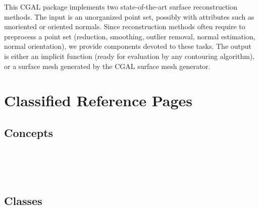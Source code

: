 


This CGAL package implements two state-of-the-art surface reconstruction methods.
The input is an unorganized point set, possibly with attributes such as unoriented or oriented normals.
Since reconstruction methods often require to preprocess a point set (reduction, smoothing,
outlier removal, normal estimation, normal orientation), we provide components devoted to these tasks.
The output is either an implicit function (ready for evaluation by any contouring algorithm),
or a surface mesh generated by the CGAL surface mesh generator.

\section{Classified Reference Pages}


\subsection{Concepts}

 \\
 \\
 \\


\subsection{Classes}

 \\
 \\
 \\


